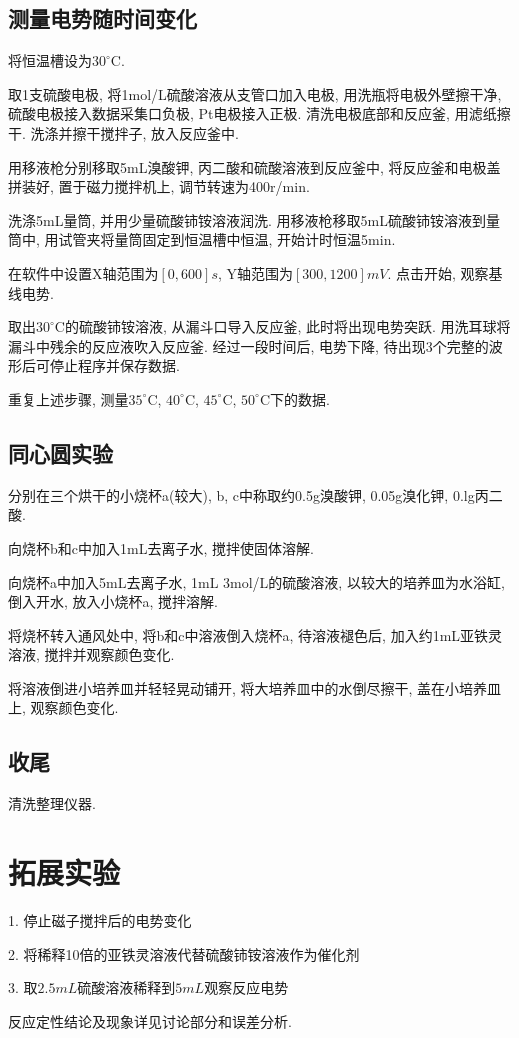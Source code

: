 \documentclass[a4paper]{article}
\begin{document}
\subsection{测量电势随时间变化}
将恒温槽设为$30^\circ$C.\par
取1支硫酸电极, 将1mol/L硫酸溶液从支管口加入电极, 用洗瓶将电极外壁擦干净, 
硫酸电极接入数据采集口负极, Pt电极接入正极. 清洗电极底部和反应釜, 用滤纸擦干. 
洗涤并擦干搅拌子, 放入反应釜中.\par
用移液枪分别移取5mL溴酸钾, 丙二酸和硫酸溶液到反应釜中, 将反应釜和电极盖拼装好, 
置于磁力搅拌机上, 调节转速为400r/min.\par
洗涤5mL量筒, 并用少量硫酸铈铵溶液润洗. 用移液枪移取5mL硫酸铈铵溶液到量筒中, 
用试管夹将量筒固定到恒温槽中恒温, 开始计时恒温5min.\par
在软件中设置X轴范围为$[0, 600]s$, Y轴范围为$[300, 1200]mV$. 点击开始, 观察基线电势. \par
取出$30^\circ$C的硫酸铈铵溶液, 从漏斗口导入反应釜, 此时将出现电势突跃. 
用洗耳球将漏斗中残余的反应液吹入反应釜. 经过一段时间后, 电势下降, 
待出现3个完整的波形后可停止程序并保存数据.\par
重复上述步骤, 测量$35^\circ$C, $40^\circ$C, $45^\circ$C, $50^\circ$C下的数据.
\subsection{同心圆实验}
分别在三个烘干的小烧杯a(较大), b, c中称取约0.5g溴酸钾, 0.05g溴化钾, 0.lg丙二酸.\par
向烧杯b和c中加入1mL去离子水, 搅拌使固体溶解.\par
向烧杯a中加入5mL去离子水, 1mL 3mol/L的硫酸溶液, 以较大的培养皿为水浴缸, 倒入开水, 
放入小烧杯a, 搅拌溶解.\par
将烧杯转入通风处中, 将b和c中溶液倒入烧杯a, 待溶液褪色后, 加入约1mL亚铁灵溶液, 搅拌并观察颜色变化.\par
将溶液倒进小培养皿并轻轻晃动铺开, 将大培养皿中的水倒尽擦干, 盖在小培养皿上, 观察颜色变化.
\subsection{收尾}
清洗整理仪器.
\section{拓展实验}
1. 停止磁子搅拌后的电势变化\par
2. 将稀释10倍的亚铁灵溶液代替硫酸铈铵溶液作为催化剂\par
3. 取$2.5mL$硫酸溶液稀释到$5mL$观察反应电势\par
反应定性结论及现象详见讨论部分和误差分析.
\end{document}
